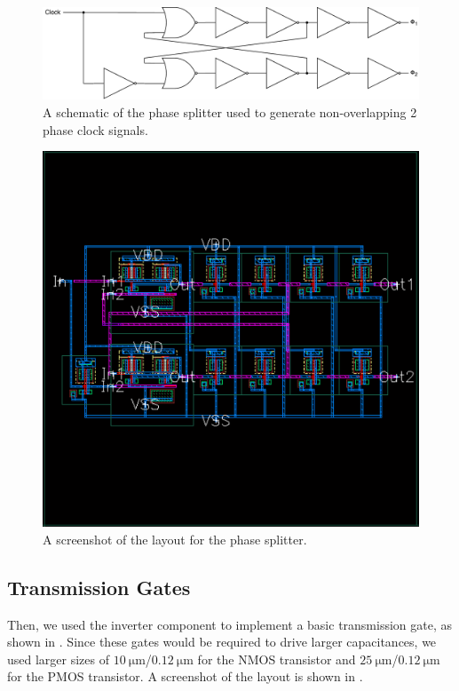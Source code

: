 \documentclass[journal,hidelinks]{IEEEtran}
\begin{document}
\begin{figure}[!htb]
  \centering
  \includegraphics[width=\columnwidth]{diagrams/phase_splitter.pdf}
  \caption{A schematic of the phase splitter used to generate non-overlapping 2 phase clock signals.}
  \label{fig:phase_splitter}
\end{figure}

\begin{figure}[!htb]
  \centering
  \includegraphics[width=0.8\columnwidth]{layout/phase_splitter.png}
  \caption{A screenshot of the layout for the phase splitter.}
  \label{fig:phase_splitter_layout}
\end{figure}

\subsection{Transmission Gates}

Then, we used the inverter component to implement a basic transmission gate, as shown in . Since these gates would be required to drive larger capacitances, we used larger sizes of $\SI{10}{\micro\meter}$/$\SI{0.12}{\micro\meter}$ for the NMOS transistor and $\SI{25}{\micro\meter}$/$\SI{0.12}{\micro\meter}$ for the PMOS transistor. A screenshot of the layout is shown in .
\end{document}
